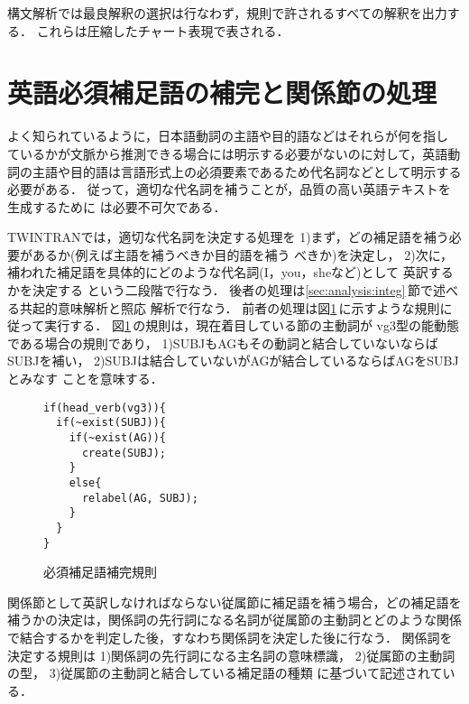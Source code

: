 構文解析では最良解釈の選択は行なわず，規則で許されるすべての解釈を出力す
る．
これらは圧縮したチャート表現\cite{Tanaka89}で表される．


\section{英語必須補足語の補完と関係節の処理}
\label{sec:analysis:rel}

よく知られているように，日本語動詞の主語や目的語などはそれらが何を指し
ているかが文脈から推測できる場合には明示する必要がないのに対して，英語動
詞の主語や目的語は言語形式上の必須要素であるため代名詞などとして明示する
必要がある．
従って，適切な代名詞を補うことが，品質の高い英語テキストを生成するために
は必要不可欠である．

TWINTRANでは，適切な代名詞を決定する処理を
1)まず，どの補足語を補う必要があるか(例えば主語を補うべきか目的語を補う
べきか)を決定し，
2)次に，補われた補足語を具体的にどのような代名詞(I，you，sheなど)として
英訳するかを決定する
という二段階で行なう．
後者の処理は\ref{sec:analysis:integ}\,節で述べる共起的意味解析と照応
解析で行なう．
前者の処理は図\ref{fig:def_rule_ex}\,に示すような規則に従って実行する．
図\ref{fig:def_rule_ex}\,の規則は，現在着目している節の主動詞が
vg3型の能動態である場合の規則であり，
1)SUBJもAGもその動詞と結合していないならばSUBJを補い，
2)SUBJは結合していないがAGが結合しているならばAGをSUBJとみなす
ことを意味する．
\begin{figure}[tbhp]
\begin{RULE}{0.5\textwidth}
\begin{verbatim}
if(head_verb(vg3)){
  if(~exist(SUBJ)){
    if(~exist(AG)){
      create(SUBJ);
    }
    else{
      relabel(AG, SUBJ);
    }
  }
}
\end{verbatim}
\end{RULE}
\caption{必須補足語補完規則}
\label{fig:def_rule_ex}
\end{figure}

関係節として英訳しなければならない従属節に補足語を補う場合，どの補足語を
補うかの決定は，関係詞の先行詞になる名詞が従属節の主動詞とどのような関係
で結合するかを判定した後，すなわち関係詞を決定した後に行なう．
関係詞を決定する規則は
1)関係詞の先行詞になる主名詞の意味標識，
2)従属節の主動詞の型，
3)従属節の主動詞と結合している補足語の種類
に基づいて記述されている．

